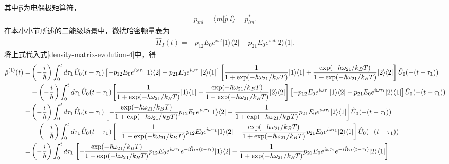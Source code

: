 \documentclass{assignment}
\begin{document}
其中$\hat{\bm{p}}$为电偶极矩算符，
\begin{align}
    p_{ml}=\langle m\rvert\hat{p}\lvert l\rangle=p_{lm}^*.
\end{align}
在本小小节所述的二能级场景中，微扰哈密顿量表为
\begin{align}
    \hat{H}_I(t)=-p_{12}E_0e^{i\omega t}\lvert 1\rangle\langle 2\rvert-p_{21}E_0e^{i\omega t}\lvert 2\rangle\langle 1\rvert.
\end{align}
将上式代入式\eqref{density-matrix-evolution-4}中，得
\tiny
\begin{align}
    \notag\hat{\rho}^{(1)}(t)=&\left(-\frac{i}{\hbar}\right)\int_0^td\tau_1\,\hat{U}_0(t-\tau_1)\left[-p_{12}E_0e^{i\omega\tau_1}\lvert 1\rangle\langle 2\rvert-p_{21}E_0e^{i\omega\tau_1}\lvert 2\rangle\langle 1\rvert\right]\left[\frac{1}{1+\exp(-\hbar\omega_{21}/k_BT)}\lvert 1\rangle\langle 1\rvert+\frac{\exp(-\hbar\omega_{21}/k_BT)}{1+\exp(-\hbar\omega_{21}/k_BT)}\lvert 2\rangle\langle 2\rvert\right]\hat{U}_0(-(t-\tau_1))\\
    \notag&-\left(-\frac{i}{\hbar}\right)\int_0^td\tau_1\,\hat{U}_0(t-\tau_1)\left[\frac{1}{1+\exp(-\hbar\omega_{21}/k_BT)}\lvert 1\rangle\langle 1\rvert+\frac{\exp(-\hbar\omega_{21}/k_BT)}{1+\exp(-\hbar\omega_{21}/k_BT)}\lvert 2\rangle\langle 2\rvert\right]\left[-p_{12}E_0e^{i\omega\tau_1}\lvert 1\rangle\langle 2\rvert-p_{21}E_0e^{i\omega\tau_1}\lvert 2\rangle\langle 1\rvert\right]\hat{U}_0(-(t-\tau_1))\\
    \notag=&\left(-\frac{i}{\hbar}\right)\int_0^td\tau_1\,\hat{U}_0(t-\tau_1)\left[-\frac{\exp(-\hbar\omega_{21}/k_BT)}{1+\exp(-\hbar\omega_{21}/k_BT)}p_{12}E_0e^{i\omega\tau_1}\lvert 1\rangle\langle 2\rvert-\frac{1}{1+\exp(-\hbar\omega_{21}/k_BT)}p_{21}E_0e^{i\omega\tau_1}\lvert 2\rangle\langle 1\rvert\right]\hat{U}_0(-(t-\tau_1))\\
    \notag&-\left(-\frac{i}{\hbar}\right)\int_0^td\tau_1\,\hat{U}_0(t-\tau_1)\left[-\frac{1}{1+\exp(-\hbar\omega_{21}/k_BT)}p_{12}E_0e^{i\omega\tau_1}\lvert 1\rangle\langle 2\rvert-\frac{\exp(-\hbar\omega_{21}/k_BT)}{1+\exp(-\hbar\omega_{21}/k_BT)}p_{21}E_0e^{i\omega\tau_1}\lvert 2\rangle\langle 1\rvert\right]\hat{U}_0(-(t-\tau_1))\\
    \notag=&\left(-\frac{i}{\hbar}\right)\int_0^td\tau_1\,\left[-\frac{\exp(-\hbar\omega_{21}/k_BT)}{1+\exp(-\hbar\omega_{21}/k_BT)}p_{12}E_0e^{i\omega\tau_1}e^{-i\tilde{\Omega}_{12}(t-\tau_1)}\lvert 1\rangle\langle 2\rvert-\frac{1}{1+\exp(-\hbar\omega_{21}/k_BT)}p_{21}E_0e^{i\omega\tau_1}e^{-i\tilde{\Omega}_{21}(t-\tau_1)}\lvert 2\rangle\langle 1\rvert\right]\\

\end{align}
\end{document}
